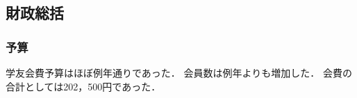 \subsection*{財政総括}


\subsubsection*{予算}
学友会費予算はほぼ例年通りであった．
会員数は例年よりも増加した． 
会費の合計としては202，500円であった．
 
